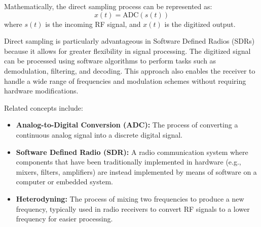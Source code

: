 Mathematically, the direct sampling process can be represented as:
\[
x(t) = \text{ADC}(s(t))
\]
where \( s(t) \) is the incoming RF signal, and \( x(t) \) is the digitized output.

Direct sampling is particularly advantageous in Software Defined Radios (SDRs) because it allows for greater flexibility in signal processing. The digitized signal can be processed using software algorithms to perform tasks such as demodulation, filtering, and decoding. This approach also enables the receiver to handle a wide range of frequencies and modulation schemes without requiring hardware modifications.

Related concepts include:
\begin{itemize}
    \item \textbf{Analog-to-Digital Conversion (ADC):} The process of converting a continuous analog signal into a discrete digital signal.
    \item \textbf{Software Defined Radio (SDR):} A radio communication system where components that have been traditionally implemented in hardware (e.g., mixers, filters, amplifiers) are instead implemented by means of software on a computer or embedded system.
    \item \textbf{Heterodyning:} The process of mixing two frequencies to produce a new frequency, typically used in radio receivers to convert RF signals to a lower frequency for easier processing.
\end{itemize}

